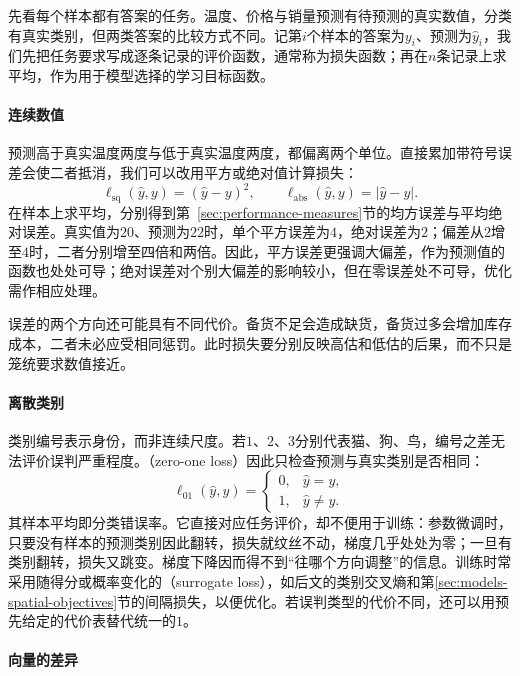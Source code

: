 先看每个样本都有答案的任务。温度、价格与销量预测有待预测的真实数值，分类有真实类别，但两类答案的比较方式不同。记第$i$个样本的答案为$y_i$、预测为$\hat{y}_i$，我们先把任务要求写成逐条记录的评价函数，通常称为损失函数；再在$n$条记录上求平均，作为用于模型选择的学习目标函数。

\paragraph{连续数值}

预测高于真实温度两度与低于真实温度两度，都偏离两个单位。直接累加带符号误差会使二者抵消，我们可以改用平方或绝对值计算损失：
\[
  \ell_{\mathrm{sq}}(\hat y,y)=(\hat y-y)^2,\qquad
  \ell_{\mathrm{abs}}(\hat y,y)=|\hat y-y|.
\]
在样本上求平均，分别得到第~\ref{sec:performance-measures}节的均方误差与平均绝对误差。真实值为$20$、预测为$22$时，单个平方误差为$4$，绝对误差为$2$；偏差从$2$增至$4$时，二者分别增至四倍和两倍。因此，平方误差更强调大偏差，作为预测值的函数也处处可导；绝对误差对个别大偏差的影响较小，但在零误差处不可导，优化需作相应处理。

误差的两个方向还可能具有不同代价。备货不足会造成缺货，备货过多会增加库存成本，二者未必应受相同惩罚。此时损失要分别反映高估和低估的后果，而不只是笼统要求数值接近。

\paragraph{离散类别}

类别编号表示身份，而非连续尺度。若$1$、$2$、$3$分别代表猫、狗、鸟，编号之差无法评价误判严重程度。（zero-one loss）因此只检查预测与真实类别是否相同：
\begin{equation}
  \ell_{01}(\hat{y},y)=
  \begin{cases}
    0, & \hat{y}=y,\\
    1, & \hat{y}\ne y.
  \end{cases}
  \label{eq:models-zero-one-loss}
\end{equation}
其样本平均即分类错误率。它直接对应任务评价，却不便用于训练：参数微调时，只要没有样本的预测类别因此翻转，损失就纹丝不动，梯度几乎处处为零；一旦有类别翻转，损失又跳变。梯度下降因而得不到“往哪个方向调整”的信息。训练时常采用随得分或概率变化的（surrogate loss），如后文的类别交叉熵和第\ref{sec:models-spatial-objectives}节的间隔损失，以便优化。若误判类型的代价不同，还可以用预先给定的代价表替代统一的$1$。

\paragraph{向量的差异}
\label{sec:models-vector-objectives}


